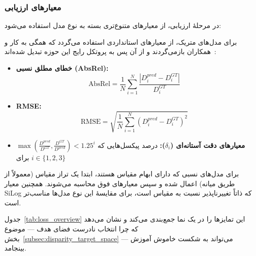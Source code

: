 \subsubsection{معیارهای ارزیابی}

در مرحلهٔ ارزیابی، از معیارهای متنوع‌تری بسته به نوع مدل استفاده می‌شود:

برای مدل‌های متریک، از معیارهای استانداردی استفاده می‌گردد که همگی به کار  و همکاران بازمی‌گردند و از آن پس به پروتکل رایج این حوزه تبدیل شده‌اند~\cite{Eigen2014Depth,Eigen2015Predicting}:
\begin{itemize}
    \item \textbf{خطای مطلق نسبی (AbsRel):} 
    \begin{equation}
    \text{AbsRel} = \frac{1}{N}\sum_{i=1}^{N} \frac{|D_i^{pred} - D_i^{GT}|}{D_i^{GT}}
    \end{equation}
    
    \item \textbf{RMSE:}
    \begin{equation}
    \text{RMSE} = \sqrt{\frac{1}{N}\sum_{i=1}^{N} (D_i^{pred} - D_i^{GT})^2}
    \end{equation}
    
    \item \textbf{معیارهای دقت آستانه‌ای ($\delta_i$):} درصد پیکسل‌هایی که $\max\left(\frac{D^{pred}}{D^{GT}}, \frac{D^{GT}}{D^{pred}}\right) < 1.25^i$ برای $i \in \{1, 2, 3\}$
\end{itemize}

برای مدل‌های نسبی که دارای ابهام مقیاس هستند، ابتدا یک تراز مقیاس (معمولاً از طریق میانه) اعمال شده و سپس معیارهای فوق محاسبه می‌شوند. همچنین معیار SiLog که ذاتاً تغییرناپذیر نسبت به مقیاس است، برای مقایسهٔ این نوع مدل‌ها مناسب‌تر است.

جدول~\ref{tab:loss_overview} این تمایزها را در یک نما جمع‌بندی می‌کند و نشان
می‌دهد که چرا انتخاب نادرست فضای هدف --- موضوع بخش~\ref{subsec:disparity_target_space}
--- می‌تواند به شکست خاموش آموزش بینجامد.

